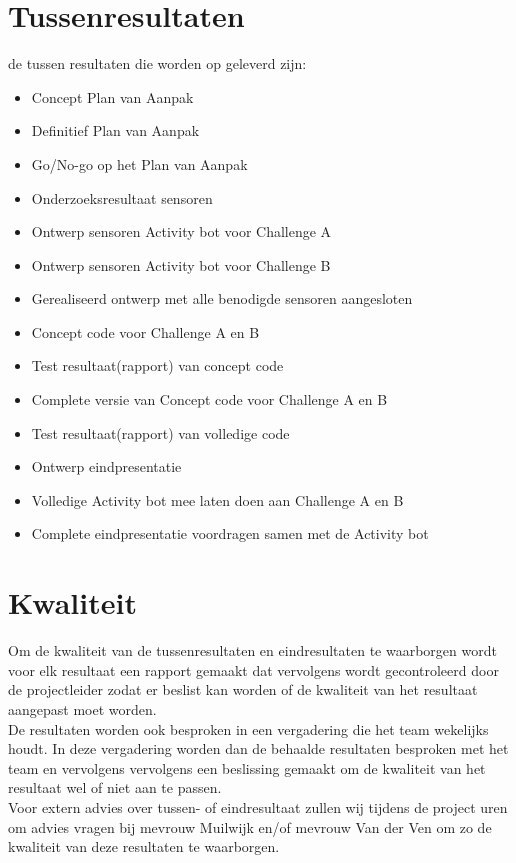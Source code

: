 \documentclass[oneside]{book}
\begin{document}
\chapter{Tussenresultaten}
	de tussen resultaten die worden op geleverd zijn:
\begin{itemize}
	\item Concept Plan van Aanpak
	\item Definitief Plan van Aanpak
	\item Go/No-go op het Plan van Aanpak
	\item Onderzoeksresultaat sensoren
	\item Ontwerp sensoren Activity bot voor Challenge A
	\item Ontwerp sensoren Activity bot voor Challenge B
	\item Gerealiseerd ontwerp met alle benodigde sensoren aangesloten
	\item Concept code voor Challenge A en B
	\item Test resultaat(rapport) van concept code
	\item Complete versie van Concept code voor Challenge A en B
	\item Test resultaat(rapport) van volledige code
	\item Ontwerp eindpresentatie
	\item Volledige Activity bot mee laten doen aan Challenge A en B
	\item Complete eindpresentatie voordragen samen met de Activity bot
\end{itemize}
\clearpage
\chapter{Kwaliteit}
Om de kwaliteit van de tussenresultaten en eindresultaten te waarborgen wordt voor elk resultaat een rapport gemaakt dat vervolgens wordt gecontroleerd door de projectleider zodat er beslist kan worden of de kwaliteit van het resultaat aangepast moet worden. \\

De resultaten worden ook besproken in een vergadering die het team wekelijks houdt. In deze vergadering worden dan de behaalde resultaten besproken met het team en vervolgens vervolgens een beslissing gemaakt om de kwaliteit van het resultaat wel of niet aan te passen. \\

Voor extern advies over tussen-  of eindresultaat zullen wij tijdens de project uren om advies vragen bij mevrouw Muilwijk en/of mevrouw Van der Ven om zo de kwaliteit van deze resultaten te waarborgen. \\
\end{document}
